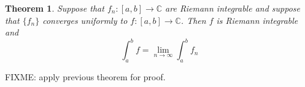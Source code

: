\documentclass[12pt]{book}
\newcommand{\abs}[1]{\left\lvert {#1} \right\rvert}
\newcommand{\C}{{\mathbb{C}}}
\newcommand{\N}{{\mathbb{N}}}
\theoremstyle{plain}
\newtheorem{thm}{Theorem}[section]
\theoremstyle{remark}
\theoremstyle{definition}
\theoremstyle{exercise}
\theoremstyle{example}
\begin{document}


\begin{thm}
Suppose that $f_n \colon [a,b] \to \C$
are Riemann integrable and suppose that $\{ f_n \}$ converges
uniformly to $f \colon [a,b] \to \C$.  Then $f$ is Riemann integrable
and
\begin{equation*}
\int_a^b f = \lim_{n\to \infty} \int_a^b f_n
\end{equation*}
\end{thm}


FIXME: apply previous theorem for proof.

%
%
\end{document}
